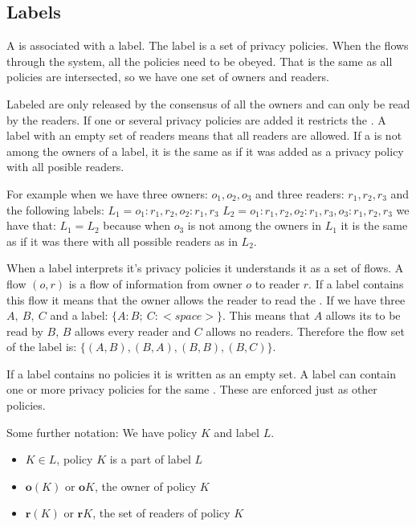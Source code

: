 \subsection{Labels}
A \xvalue{} is associated with a label.
The label is a set of privacy policies.
When the \xvalue{} flows through the system, all the policies need to be obeyed.
That is the same as all policies are intersected, so we have one set of owners and readers.


Labeled \xvalues{} are only released by the consensus of all the owners and can only be read by the readers.
If one or several privacy policies are added it restricts the \xvalue{}.
A label with an empty set of readers means that all readers are allowed.
If a \principal{} is not among the owners of a label, it is the same as if it was added as a privacy policy with all posible readers.


For example when we have three owners: $o_1, o_2, o_3$ and three readers: $r_1, r_2, r_3$ and the following labels:
$L_1 = {o_1: r_1,r_2, o_2: r_1, r_3}$ $L_2 = {o_1: r_1,r_2, o_2: r_1, r_3, o_3: r_1, r_2, r_3}$ we have that: $L_1 = L_2$ because when $o_3$ is not among the owners in $L_1$ it is the same as if it was there with all possible readers as in $L_2$.


When a label interprets it's privacy policies it understands it as a set of flows.
A flow $(o,r)$ is a flow of information from owner $o$ to reader $r$.
If a label contains this flow it means that the owner allows the reader to read the \xvalue{}.
If we have three \principals{} $A,\ B,\ C$ and a label: $\{A: B; \ C: <space> \}$.
This means that $A$ allows its \xvalue{} to be read by $B$, $B$ allows every reader and $C$ allows no readers.
Therefore the flow set of the label is: $\{(A,B), (B,A), (B,B), (B,C) \}$.


If a label contains no policies it is written as an empty set.
A label can contain one or more privacy policies for the same \principal{}.
These are enforced just as other policies.

Some further notation:
We have policy $K$ and label $L$.
\begin{itemize}
\item $K \in L$, policy $K$ is a part of label $L$
\item $\textbf{o}(K)$ or $\textbf{o}K$, the owner of policy $K$
\item $\textbf{r}(K)$ or $\textbf{r}K$, the set of readers of policy $K$
\end{itemize}

